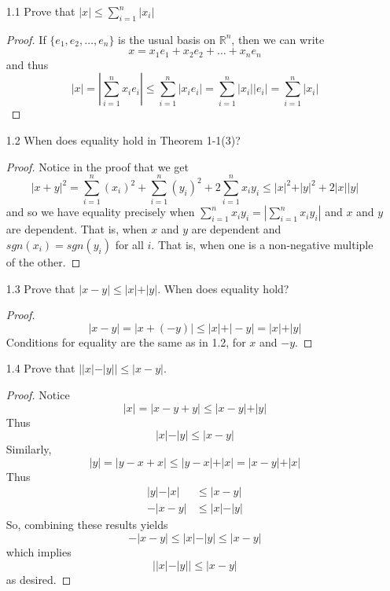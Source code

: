 \begin{enumerate}
    \item[1.1] Prove that \( \left| x \right| \leq \sum_{i=1}^n \left| x_i \right| \)
    
    \begin{proof}
    If \( \{ e_1, e_2, \ldots, e_n \} \) is the usual basis on \( \mathbb{R}^n \), then we can write
    \[
    x = x_1e_1+x_2e_2+\ldots+x_ne_n
    \]
    and thus
    \[
    \vert x \vert = \left| \sum_{i=1}^n x_ie_i \right| \leq \sum_{i=1}^n \vert x_i e_i \vert = \sum_{i=1}^n \vert x_i \vert \vert e_i \vert = \sum_{i=1}^n \vert x_i \vert
    \]
    \end{proof}
    
    \item[1.2] When does equality hold in Theorem 1-1(3)?
    
    \begin{proof}
    Notice in the proof that we get
    \[
    \vert x+y \vert^2 = \sum_{i=1}^n (x_i)^2 + \sum_{i=1}^n (y_i)^2 + 2 \sum_{i=1}^n x_iy_i \leq \vert x \vert^2 + \vert y \vert^2 +2\vert x \vert \vert y \vert
    \]
    and so we have equality precisely when \( \sum_{i=1}^n x_iy_i = \left| \sum_{i=1}^n x_iy_i \right|\) and \( x \) and \( y \) are dependent. That is, when \( x \) and \( y\) are dependent and \( sgn(x_i) = sgn(y_i) \) for all \( i \). That is, when one is a non-negative multiple of the other.
    \end{proof}
    
    \item[1.3] Prove that \( \vert x-y \vert \leq \vert x \vert + \vert y \vert \). When does equality hold?
    
    \begin{proof}
    \[
    \vert x-y \vert = \vert x + (-y) \vert \leq \vert x \vert + \vert -y \vert = \vert x \vert + \vert y \vert
    \]
    Conditions for equality are the same as in 1.2, for \( x \) and \( -y \). 
    \end{proof}
    
    \item[1.4] Prove that \( \left| \vert x \vert - \vert y \vert \right| \leq \vert x-y \vert \).
    
    \begin{proof}
    Notice
    \[
    \vert x \vert = \vert x - y +y \vert \leq \vert x-y \vert + \vert y \vert 
    \]
    Thus
    \[
    \vert x \vert - \vert y \vert \leq \vert x-y \vert
    \]
    Similarly,
    \[
    \vert y \vert = \vert y-x+x \vert \leq \vert y-x \vert + \vert x \vert = \vert x-y \vert + \vert x \vert
    \]
    Thus
    \begin{align*}
        \vert y \vert - \vert x \vert &\leq \vert x-y \vert \\
        -\vert x-y \vert &\leq \vert x \vert - \vert y \vert
    \end{align*}
    So, combining these results yields
    \[
    -\vert x-y \vert \leq \vert x \vert - \vert y \vert \leq \vert x-y \vert
    \]
    which implies
    \[
    \left| \vert x \vert - \vert y \vert \right| \leq \vert x-y \vert
    \]
    as desired.
    \end{proof}
    

\end{enumerate}

